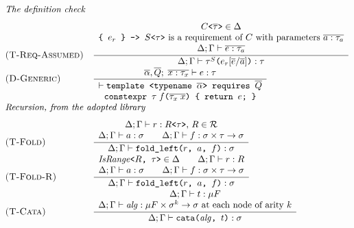 \begin{figure}[htbp]
\[\begin{array}{@{}l@{\quad}l@{}}
\\[7pt]
\multicolumn{2}{@{}l}{\text{\textit{The definition check}}}
\\[7pt]
\textsc{(T-Req-Assumed)} & \dfrac{\begin{array}{c} C\texttt{<}\overline{\tau}\texttt{>} \in \Delta \\ \texttt{\{ }e_r\texttt{ \} -> }S\texttt{<}\tau\texttt{>} \text{ is a requirement of } C \text{ with parameters } \overline{a : \tau_a} \\ \Delta; \Gamma \vdash \overline{e : \tau_a} \end{array}}{\Delta; \Gamma \vdash \tau^{S}\texttt{(}e_r[\overline{e}/\overline{a}]\texttt{)} : \tau}
\\[7pt]
\textsc{(D-Generic)} & \dfrac{\overline{\alpha}, \overline{Q};\; \overline{x : \tau_x} \vdash e : \tau}{\begin{array}{c}\vdash \texttt{template <typename }\overline{\alpha}\texttt{> requires } \overline{Q} \\ \texttt{constexpr } \tau\; f\texttt{(}\overline{\tau_x\; x}\texttt{) \{ return } e\texttt{; \}}\end{array}}
\\[7pt]
\multicolumn{2}{@{}l}{\text{\textit{Recursion, from the adopted library}}}
\\[7pt]
\textsc{(T-Fold)} & \dfrac{\begin{array}{c} \Delta; \Gamma \vdash r : R\texttt{<}\tau\texttt{>} \text{, } R \in \mathcal{R} \\ \Delta; \Gamma \vdash a : \sigma \qquad \Delta; \Gamma \vdash f : \sigma \times \tau \to \sigma \end{array}}{\Delta; \Gamma \vdash \texttt{fold\_left(}r\texttt{, }a\texttt{, }f\texttt{)} : \sigma}
\\[7pt]
\textsc{(T-Fold-R)} & \dfrac{\begin{array}{c} \mathit{IsRange}\texttt{<}R\texttt{, }\tau\texttt{>} \in \Delta \qquad \Delta; \Gamma \vdash r : R \\ \Delta; \Gamma \vdash a : \sigma \qquad \Delta; \Gamma \vdash f : \sigma \times \tau \to \sigma \end{array}}{\Delta; \Gamma \vdash \texttt{fold\_left(}r\texttt{, }a\texttt{, }f\texttt{)} : \sigma}
\\[7pt]
\textsc{(T-Cata)} & \dfrac{\begin{array}{c} \Delta; \Gamma \vdash t : \mu F \\ \Delta; \Gamma \vdash \mathit{alg} : \mu F \times \sigma^{k} \to \sigma \text{ at each node of arity } k \end{array}}{\Delta; \Gamma \vdash \texttt{cata(}\mathit{alg}\texttt{, }t\texttt{)} : \sigma}

\end{array}\]
\end{figure}
